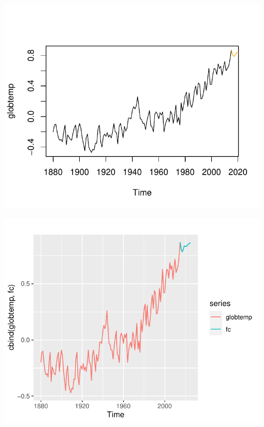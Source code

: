 \documentclass[12pt, a4paper]{article}\usepackage[]{graphicx}\usepackage[]{color}
\makeatletter
\def\maxwidth{ %
  \ifdim\Gin@nat@width>\linewidth
    \linewidth
  \else
    \Gin@nat@width
  \fi
}
\newenvironment{knitrout}{}{} %
\makeatother
\begin{document}
\begin{knitrout}
{}




{\centering \includegraphics[width=\maxwidth]{figure/unnamed-chunk-16-3} 

}




{\centering \includegraphics[width=\maxwidth]{figure/unnamed-chunk-16-4} 

}


\end{knitrout}
\end{document}
